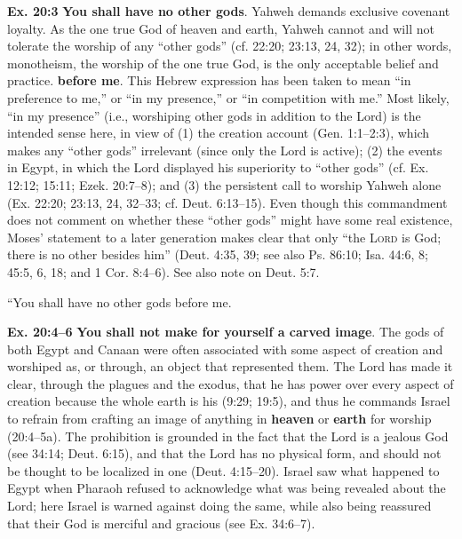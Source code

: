 \documentclass{bible-study-handout}
\begin{document}
\begin{studycomment}\textbf{Ex. 20:3} \textbf{You shall have no other gods}. Yahweh demands exclusive covenant loyalty. As the one true God of heaven and earth, Yahweh cannot and will not tolerate the worship of any “other gods” (cf. 22:20; 23:13, 24, 32); in other words, monotheism, the worship of the one true God, is the only acceptable belief and practice. \textbf{before me}. This Hebrew expression has been taken to mean “in preference to me,” or “in my presence,” or “in competition with me.” Most likely, “in my presence” (i.e., worshiping other gods in addition to the Lord) is the intended sense here, in view of (1) the creation account (Gen. 1:1–2:3), which makes any “other gods” irrelevant (since only the Lord is active); (2) the events in Egypt, in which the Lord displayed his superiority to “other gods” (cf. Ex. 12:12; 15:11; Ezek. 20:7–8); and (3) the persistent call to worship Yahweh alone (Ex. 22:20; 23:13, 24, 32–33; cf. Deut. 6:13–15). Even though this commandment does not comment on whether these “other gods” might have some real existence, Moses’ statement to a later generation makes clear that only “the \textsc{Lord} is God; there is no other besides him” (Deut. 4:35, 39; see also Ps. 86:10; Isa. 44:6, 8; 45:5, 6, 18; and 1 Cor. 8:4–6). See also note on Deut. 5:7.\end{studycomment}“You shall have no other gods before me.

\begin{studycommentinline}\textbf{Ex. 20:4–6} \textbf{You shall not make for yourself a carved image}. The gods of both Egypt and Canaan were often associated with some aspect of creation and worshiped as, or through, an object that represented them. The Lord has made it clear, through the plagues and the exodus, that he has power over every aspect of creation because the whole earth is his (9:29; 19:5), and thus he commands Israel to refrain from crafting an image of anything in \textbf{heaven} or \textbf{earth} for worship (20:4–5a). The prohibition is grounded in the fact that the Lord is a jealous God (see 34:14; Deut. 6:15), and that the Lord has no physical form, and should not be thought to be localized in one (Deut. 4:15–20). Israel saw what happened to Egypt when Pharaoh refused to acknowledge what was being revealed about the Lord; here Israel is warned against doing the same, while also being reassured that their God is merciful and gracious (see Ex. 34:6–7).\end{studycommentinline}
\end{document}
